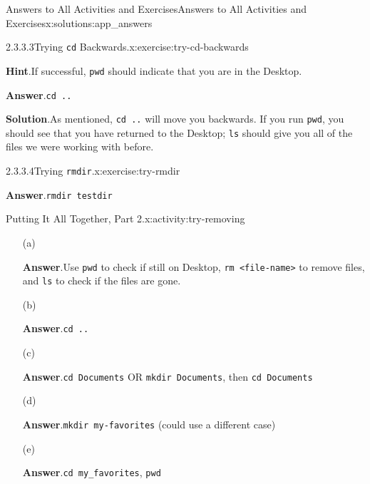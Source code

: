 \documentclass[oneside,10pt,]{book}
\newcommand{\blocktitlefont}{\relax}
\newcommand{\mono}[1]{\texttt{#1}}
\begin{document}
\begin{solutions-chapter}{Answers to All Activities and Exercises}{}{Answers to All Activities and Exercises}{}{}{x:solutions:app_answers}
\begin{inlinesolution}{2.3.3.3}{Trying \mono{cd} Backwards.}{x:exercise:try-cd-backwards}
\par\smallskip%
\noindent\textbf{\blocktitlefont Hint}.\hypertarget{g:hint:idm480467960-back}{}\quad{}If successful, \mono{pwd} should indicate that you are in the Desktop.%
\par\smallskip%
\noindent\textbf{\blocktitlefont Answer}.\hypertarget{g:answer:idm480466808-back}{}\quad{}\mono{cd ..}%
\par\smallskip%
\noindent\textbf{\blocktitlefont Solution}.\hypertarget{g:solution:idm480466680-back}{}\quad{}As mentioned, \mono{cd ..} will move you backwards. If you run \mono{pwd}, you should see that you have returned to the Desktop; \mono{ls} should give you all of the files we were working with before.%
\end{inlinesolution}%
\begin{inlinesolution}{2.3.3.4}{Trying \mono{rmdir}.}{x:exercise:try-rmdir}%
\par\smallskip%
\noindent\textbf{\blocktitlefont Answer}.\hypertarget{g:answer:idm480461432-back}{}\quad{}\mono{rmdir testdir}%
\end{inlinesolution}%
\begin{activitysolution}{2.3}{Putting It All Together, Part 2.}{x:activity:try-removing}%
\begin{enumerate}[font=\bfseries,label=(\alph*),ref=\alph*]
\item[(a)]\par\smallskip%
\noindent\textbf{\blocktitlefont Answer}.\hypertarget{g:answer:idm480452344-back}{}\quad{}Use \mono{pwd} to check if still on Desktop, \mono{rm <file-name>} to remove files, and \mono{ls} to check if the files are gone.%
\item[(b)]\par\smallskip%
\noindent\textbf{\blocktitlefont Answer}.\hypertarget{g:answer:idm480454776-back}{}\quad{}\mono{cd ..}%
\item[(c)]\par\smallskip%
\noindent\textbf{\blocktitlefont Answer}.\hypertarget{g:answer:idm480453112-back}{}\quad{}\mono{cd Documents} OR \mono{mkdir Documents}, then \mono{cd Documents}%
\item[(d)]\par\smallskip%
\noindent\textbf{\blocktitlefont Answer}.\hypertarget{g:answer:idm480445048-back}{}\quad{}\mono{mkdir my-favorites} (could use a different case)%
\item[(e)]\par\smallskip%
\noindent\textbf{\blocktitlefont Answer}.\hypertarget{g:answer:idm480441592-back}{}\quad{}\mono{cd my\_favorites}, \mono{pwd}%

\end{enumerate}
\end{activitysolution}
\end{solutions-chapter}
\end{document}
